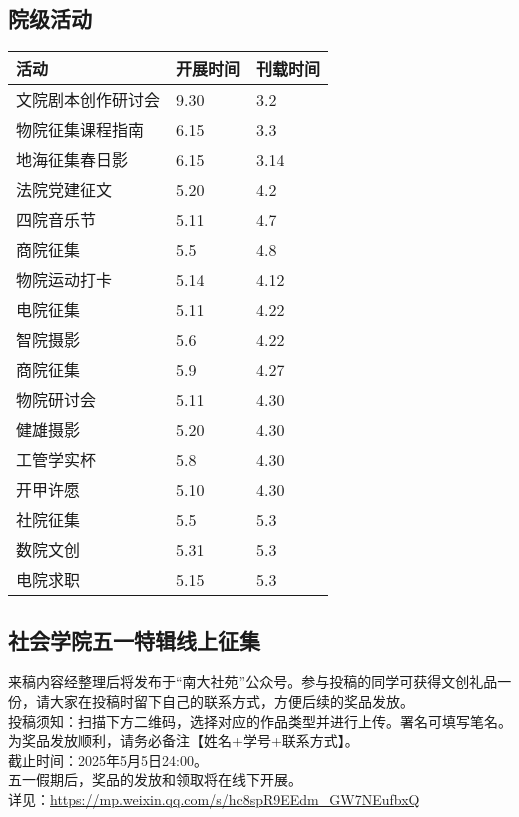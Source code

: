 \documentclass[letterpaper, 12pt]{article}
\begin{document}
\begin{multicols}{2}
\section{院级活动}
\begin{tabular}{|>{\centering\arraybackslash}m{}|m{}|m{}|}
\hline
    活动 & 开展时间 & 刊载时间\\
    \hline\hline
    文院剧本创作研讨会 & 9.30 & 3.2\\
    物院征集课程指南 & 6.15 & 3.3\\
    地海征集春日影 & 6.15 & 3.14\\
    法院党建征文 & 5.20 & 4.2\\
    四院音乐节 & 5.11 & 4.7\\
    商院征集 & 5.5 & 4.8\\
    物院运动打卡 & 5.14 & 4.12\\
    电院征集 & 5.11 & 4.22\\
    智院摄影 & 5.6 & 4.22\\
    商院征集 & 5.9 & 4.27\\
    物院研讨会 & 5.11 & 4.30\\
    健雄摄影 & 5.20 & 4.30\\
    工管学实杯 & 5.8 & 4.30\\
    开甲许愿 & 5.10 & 4.30\\
    社院征集 & 5.5 & 5.3\\
    数院文创 & 5.31 & 5.3\\
    电院求职 & 5.15 & 5.3\\
    \hline
\end{tabular}
\subsection{社会学院五一特辑线上征集} %
来稿内容经整理后将发布于“南大社苑”公众号。参与投稿的同学可获得文创礼品一份，请大家在投稿时留下自己的联系方式，方便后续的奖品发放。
\\投稿须知：扫描下方二维码，选择对应的作品类型并进行上传。署名可填写笔名。为奖品发放顺利，请务必备注【姓名+学号+联系方式】。
\\截止时间：2025年5月5日24:00。
\\五一假期后，奖品的发放和领取将在线下开展。
\\详见：\url{https://mp.weixin.qq.com/s/hc8spR9EEdm_GW7NEufbxQ}


\end{multicols}
\end{document}
